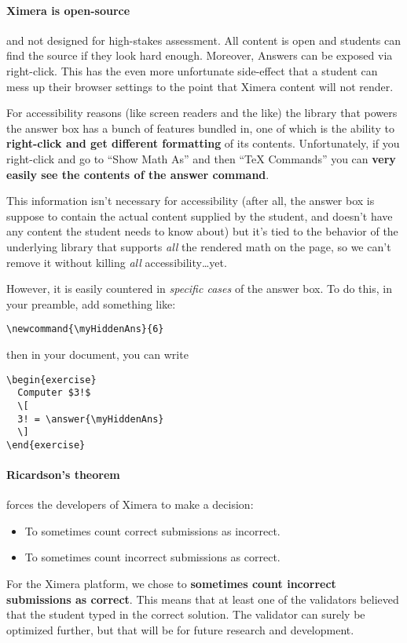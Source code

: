 \documentclass{ximera}
\begin{document}
\paragraph{Ximera is open-source} and not designed for high-stakes assessment.
All content is
open and students can find the source if they look hard enough. Moreover,
Answers can be exposed via right-click. This has the even more unfortunate
side-effect that a student can mess up their browser settings to the point that
Ximera content will not render.

For accessibility reasons (like screen readers and the like) the library
that powers the answer box has a bunch of features bundled in, one of which is
the ability to \textbf{right-click and get different formatting} of its
contents.
Unfortunately, if you right-click and go to ``Show Math As'' and then ``TeX
Commands'' you can \textbf{very easily see the contents of the answer command}.

This information isn't necessary for accessibility
(after all, the answer box is suppose to contain the actual content supplied by
the student, and doesn't have any content the student needs to know about) but
it's tied to the behavior of the underlying library that supports \textit{all}
the rendered math on the page, so we can't remove it without killing
\textit{all} accessibility\dots yet.

However, it is easily countered in \textit{specific cases} of the answer box.
To do this, in your preamble, add something like:
\begin{verbatim}
\newcommand{\myHiddenAns}{6}
\end{verbatim}
then in your document, you can write
\begin{verbatim}
\begin{exercise}
  Computer $3!$
  \[
  3! = \answer{\myHiddenAns}
  \]  
\end{exercise}
\end{verbatim}

\paragraph{Ricardson's theorem} forces the developers of Ximera to make a
decision:
\begin{itemize}
  \item To sometimes count correct submissions as incorrect.
  \item To sometimes count incorrect submissions as correct.
\end{itemize}
For the Ximera platform, we chose to \textbf{sometimes count incorrect
  submissions as correct}. This means that at least one of the validators
believed that the student typed in the correct solution. The validator can
surely be optimized further, but that will be for future research and
development.
\end{document}
